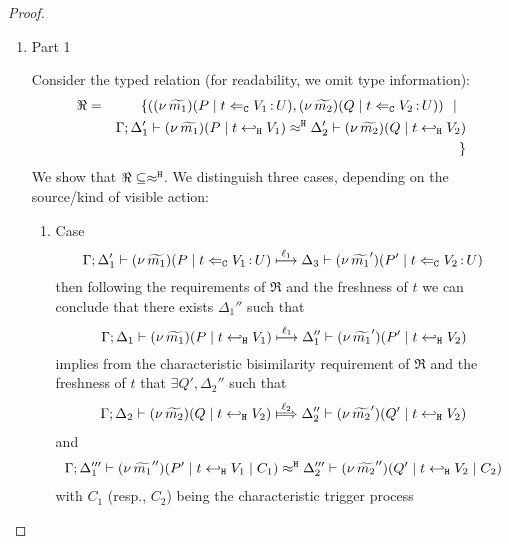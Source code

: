 \begin{proof}
	\begin{enumerate}
		\item	Part 1

				\noi Consider the typed relation (for readability, we omit type information):
				\begin{eqnarray*}
					\Re	&=&		\{	((\nu\, \widetilde{m_1})(P \;|\; t \Leftarrow_{\mathtt{C}} V_1{\,:\,}U ),
										(\nu\, \widetilde{m_2})(Q \;|\; t \Leftarrow_{\mathtt{C}} V_2{\,:\,}U))
								\ \ |\ \ \\
						&&			\Gamma; \Delta_1' \vdash (\nu\, \widetilde{m_1})(P \;|\; t \hookleftarrow_{\mathtt{H}} V_1) \approx^\mathtt{H} \Delta_2' \vdash (\nu\, \widetilde{m_2})(Q \;|\; t \hookleftarrow_{\mathtt{H}} V_2)
						\\
						&&		\}
				\end{eqnarray*}
				We show that $\Re \subseteq \approx^\mathtt{H}$.
				We distinguish three cases, depending on the source/kind of visible action: 
				\begin{enumerate}
					\item	Case
						\[
							\Gamma; \Delta_1' \vdash (\nu\, \widetilde{m_1})(P \;|\; t \Leftarrow_{\mathtt{C}} V_1{\,:\,}U ) \stackrel{\ell_1}{\longmapsto} \Delta_3 \vdash{(\nu\, \widetilde{m_1}')(P' \;|\;t \Leftarrow_{\mathtt{C}} V_2{\,:\,}U )}
						\]
							then following the requirements of $\Re$ and the freshness of $t$
							we can conclude that there exists $\Delta_1''$ such that
						\[
							\Gamma; \Delta_1 \vdash (\nu\, \widetilde{m_1})(P \;|\; t \hookleftarrow_{\mathtt{H}} V_1) \stackrel{\ell_1}{\longmapsto} \Delta_1'' \vdash (\nu\, \widetilde{m_1}')(P' \;|\; t \hookleftarrow_{\mathtt{H}} V_2)
						\]
							implies from the characteristic bisimilarity requirement of $\Re$ and
							the freshness of $t$ that $\exists Q', \Delta_2''$ such that
						\begin{eqnarray}
							\horel{\Gamma}{\Delta_2}{\newsp{\widetilde{m_2}}{Q \Par \htrigger{t}{V_2}}}
							{\Hby{\ell_2}}
							{\Delta_2''}{\newsp{\widetilde{m_2}'}{Q' \Par \htrigger{t}{V_2}}}
							\label{proof:trig_equiv00}
						\end{eqnarray}
							and
						\begin{eqnarray}
							\Gamma; \Delta_1''' \vdash (\nu\, \widetilde{m_1}'')(P' \;|\; t \hookleftarrow_{\mathtt{H}} V_1 \;|\; C_1) \approx^\mathtt{H} \Delta_2''' \vdash (\nu\, \widetilde{m_2}'')(Q' \;|\; t \hookleftarrow_{\mathtt{H}} V_2 \;|\; C_2)
							\label{proof:trig_equiv11}
						\end{eqnarray}
							with $C_1$ (resp., $C_2$) being the characteristic trigger process

\end{enumerate}
\end{enumerate}
\end{proof}
